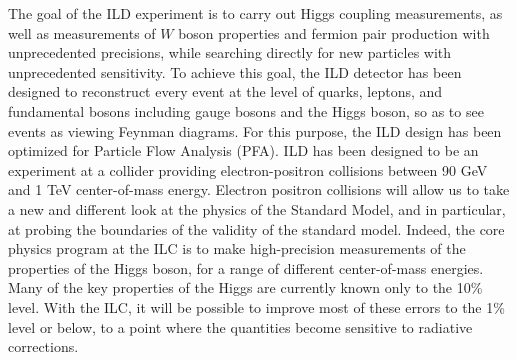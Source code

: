 The goal of the ILD experiment is to carry out Higgs coupling measurements, as well as measurements of  $W$ boson properties and fermion pair production with unprecedented precisions, while searching directly for new particles with unprecedented sensitivity.
To achieve this goal, the ILD detector has been designed to reconstruct every event at the level of quarks, leptons, and fundamental bosons including gauge bosons and the Higgs boson, so as to see events as viewing Feynman diagrams. For this purpose, the ILD design has been optimized for Particle Flow Analysis (PFA).
ILD has been designed to be an experiment at a collider providing electron-positron collisions between 90 GeV and 1 TeV center-of-mass energy. 
Electron positron collisions will allow us to take a new and different look at the physics of the Standard Model, and in particular, at probing the boundaries of the validity of the standard model. 
Indeed, the core physics program at the ILC is to make high-precision
 measurements of the properties of the Higgs boson, for a range of different center-of-mass energies. 
Many of the key properties of the Higgs are currently known only to the 10\% level. With the ILC, it will be possible to improve most of these errors to the 1\% level or below, to a point where the quantities become sensitive to radiative corrections. %


